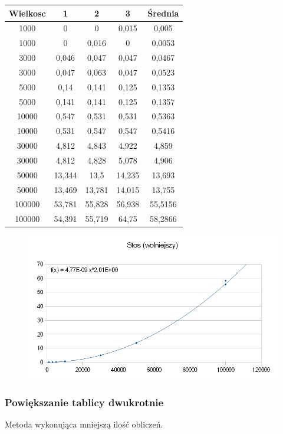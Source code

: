 \documentclass[12pt,a4paper,titlepage]{article}
\begin{document}
\begin{center}
\begin {tabular}{|c|c|c|c|c|}\hline
Wielkosc & 1 & 2 & 3 & Średnia \\\hline
1000&0&0&0,015&0,005 \\\hline
1000&0&0,016&0&0,0053 \\\hline
3000&0,046&0,047&0,047&0,0467 \\\hline
3000&0,047&0,063&0,047&0,0523 \\\hline
5000&0,14&0,141&0,125&0,1353 \\\hline
5000&0,141&0,141&0,125&0,1357 \\\hline
10000&0,547&0,531&0,531&0,5363 \\\hline
10000&0,531&0,547&0,547&0,5416 \\\hline
30000&4,812&4,843&4,922&4,859 \\\hline
30000&4,812&4,828&5,078&4,906 \\\hline
50000&13,344&13,5&14,235&13,693 \\\hline
50000&13,469&13,781&14,015&13,755 \\\hline
100000&53,781&55,828&56,938&55,5156 \\\hline
100000&54,391&55,719&64,75&58,2866 \\\hline
\end{tabular}
\end {center}
\begin{figure}[h]
\begin{center}
\includegraphics[scale=0.5]{stos_1.png}
\end{center}
\end{figure}

\newpage
\subsubsection{Powiększanie tablicy dwukrotnie}
Metoda wykonująca mniejszą ilość obliczeń.
\end{document}
